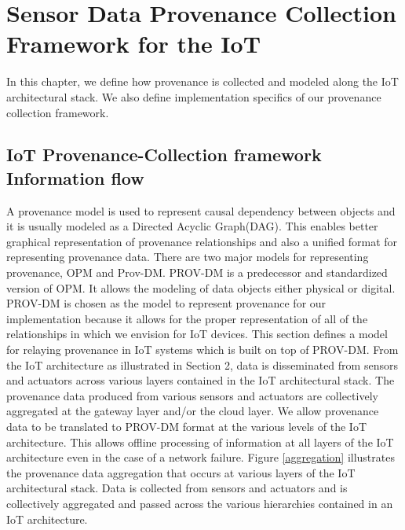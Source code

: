 
\chapter{Sensor Data Provenance Collection Framework for the IoT}

In this chapter, we define how provenance is collected and modeled along the IoT architectural stack. We also define implementation specifics of our provenance collection framework. 

\section{IoT Provenance-Collection framework Information flow}
%

A provenance model is used to represent causal dependency between objects and it is usually modeled as a Directed Acyclic Graph(DAG). This enables better graphical representation of provenance relationships and also a unified format for representing provenance data. There are two major models for representing provenance, OPM and Prov-DM. PROV-DM is a predecessor and standardized version of OPM. It allows the modeling of data objects either physical or digital. PROV-DM is chosen as the model to represent provenance for our implementation because it allows for the proper representation of all of the relationships in which we envision for IoT devices. This section defines a model for relaying provenance in IoT systems which is built on top of PROV-DM. 
From the IoT architecture as illustrated in Section 2, data is disseminated from sensors and actuators across various layers contained in the IoT architectural stack. The provenance data produced from various sensors and actuators are collectively aggregated at the gateway layer and/or the cloud layer. We allow provenance data to be translated to PROV-DM format at the various levels of the IoT architecture. This allows offline processing of information at all layers of the IoT architecture even in the case of a network failure. 
 Figure \ref{aggregation} illustrates the provenance data aggregation that occurs at various layers of the IoT architectural stack. Data is collected from sensors and actuators and is collectively aggregated and passed across the various hierarchies contained in an IoT architecture. 


